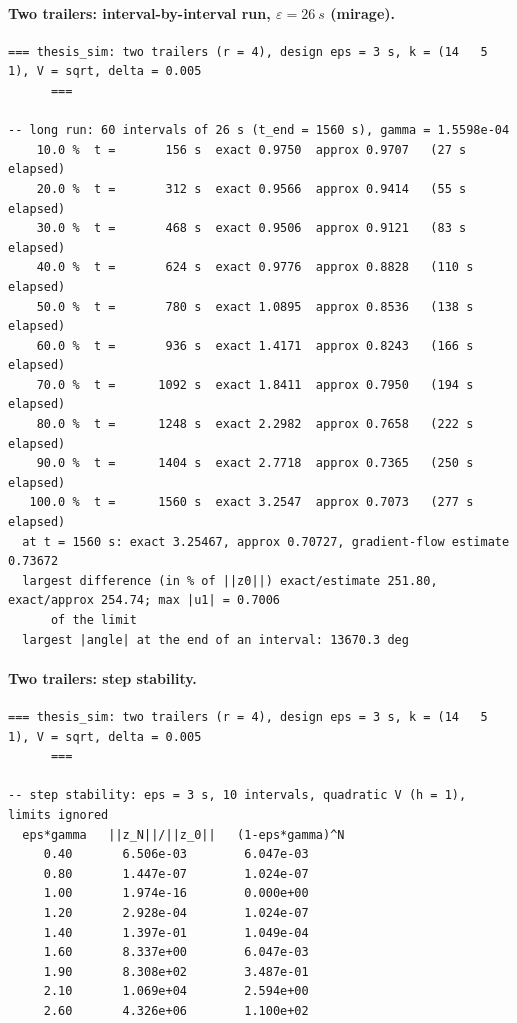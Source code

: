 \paragraph{Two trailers: interval-by-interval run, $\varepsilon=\SI{26}{s}$ (mirage).}

{\scriptsize\begin{verbatim}
=== thesis_sim: two trailers (r = 4), design eps = 3 s, k = (14   5   1), V = sqrt, delta = 0.005
      ===

-- long run: 60 intervals of 26 s (t_end = 1560 s), gamma = 1.5598e-04
    10.0 %  t =       156 s  exact 0.9750  approx 0.9707   (27 s elapsed)
    20.0 %  t =       312 s  exact 0.9566  approx 0.9414   (55 s elapsed)
    30.0 %  t =       468 s  exact 0.9506  approx 0.9121   (83 s elapsed)
    40.0 %  t =       624 s  exact 0.9776  approx 0.8828   (110 s elapsed)
    50.0 %  t =       780 s  exact 1.0895  approx 0.8536   (138 s elapsed)
    60.0 %  t =       936 s  exact 1.4171  approx 0.8243   (166 s elapsed)
    70.0 %  t =      1092 s  exact 1.8411  approx 0.7950   (194 s elapsed)
    80.0 %  t =      1248 s  exact 2.2982  approx 0.7658   (222 s elapsed)
    90.0 %  t =      1404 s  exact 2.7718  approx 0.7365   (250 s elapsed)
   100.0 %  t =      1560 s  exact 3.2547  approx 0.7073   (277 s elapsed)
  at t = 1560 s: exact 3.25467, approx 0.70727, gradient-flow estimate 0.73672
  largest difference (in % of ||z0||) exact/estimate 251.80, exact/approx 254.74; max |u1| = 0.7006
      of the limit
  largest |angle| at the end of an interval: 13670.3 deg
\end{verbatim}}

\paragraph{Two trailers: step stability.}

{\scriptsize\begin{verbatim}
=== thesis_sim: two trailers (r = 4), design eps = 3 s, k = (14   5   1), V = sqrt, delta = 0.005
      ===

-- step stability: eps = 3 s, 10 intervals, quadratic V (h = 1), limits ignored
  eps*gamma   ||z_N||/||z_0||   (1-eps*gamma)^N
     0.40       6.506e-03        6.047e-03
     0.80       1.447e-07        1.024e-07
     1.00       1.974e-16        0.000e+00
     1.20       2.928e-04        1.024e-07
     1.40       1.397e-01        1.049e-04
     1.60       8.337e+00        6.047e-03
     1.90       8.308e+02        3.487e-01
     2.10       1.069e+04        2.594e+00
     2.60       4.326e+06        1.100e+02
\end{verbatim}}

